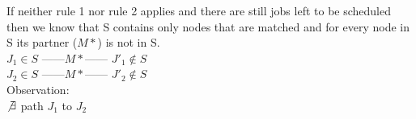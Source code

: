If neither rule 1 nor rule 2 applies and there are still jobs left to be scheduled then we know that S contains only nodes that are matched
and for every node in S its partner ($M*$) is not in S.\\

$J{_1} \in S$ ------$M*$------
$J'{_1} \notin S$\\

$J{_2} \in S$ ------$M*$------
$J'{_2} \notin S$\\

Observation:\\
$\not\exists$ path $J_{1}$ to $J_{2}$ 




